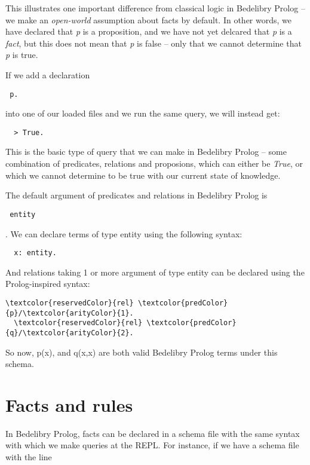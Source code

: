 \documentclass{book}
\begin{document}
This illustrates one important difference from classical logic in Bedelibry Prolog -- we make an \textit{open-world} assumption about facts by default. In other words, we have declared that \textit{p} is a proposition, and we have not yet delcared that \textit{p} is a \textit{fact}, but this does not mean that \textit{p} is false -- only that we cannot determine that \textit{p} is true. 

If we add a declaration \begin{verbatim} p. \end{verbatim} into one of our loaded files and we run the same query, we will instead get:

\begin{verbatim}
  > True.
\end{verbatim}

This is the basic type of query that we can make in Bedelibry Prolog -- some combination of predicates, relations and proposions, which can either be \textit{True}, or which we cannot determine to be true with our current state of knowledge.

The default argument of predicates and relations in Bedelibry Prolog is \begin{verbatim} entity \end{verbatim}. We can declare terms of type entity using the following syntax:

\begin{verbatim}
  x: entity.
\end{verbatim}

And relations taking 1 or more argument of type entity can be declared using the Prolog-inspired syntax:

\begin{Verbatim}[commandchars=\\\{\}]
  \textcolor{reservedColor}{rel} \textcolor{predColor}{p}/\textcolor{arityColor}{1}.
  \textcolor{reservedColor}{rel} \textcolor{predColor}{q}/\textcolor{arityColor}{2}.
\end{Verbatim}

So now, p(x), and q(x,x) are both valid Bedelibry Prolog terms under this schema.

\section{Facts and rules}

In Bedelibry Prolog, facts can be declared in a schema file with the same syntax with which we make queries at the REPL. For instance, if we have a schema file with the line
\end{document}
